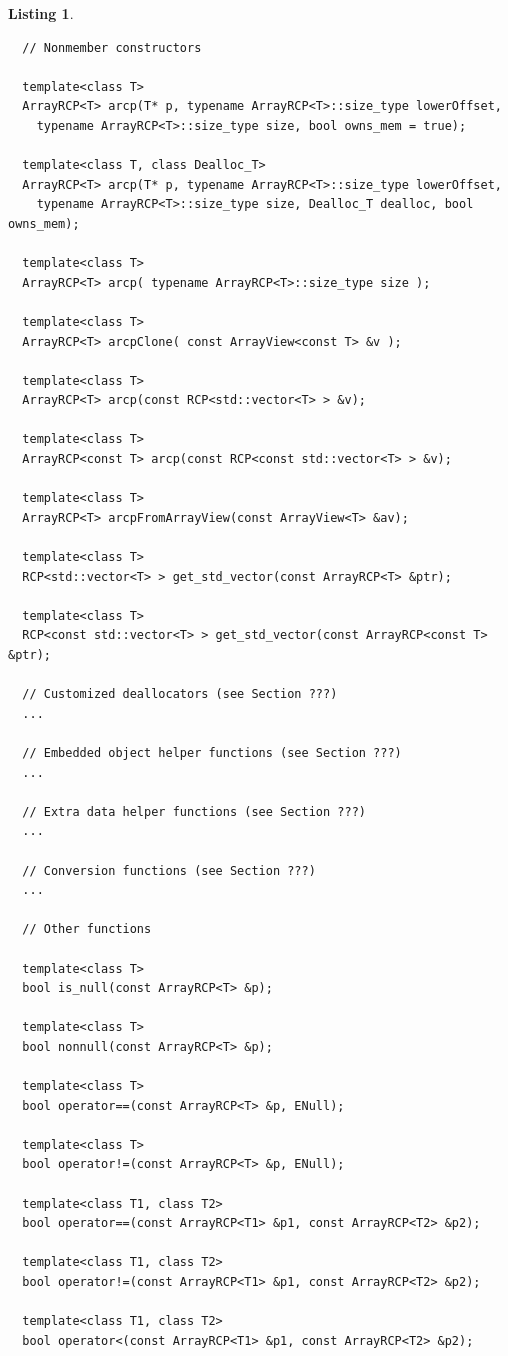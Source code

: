 \documentclass[pdf,ps2pdf,11pt]{SANDreport}
\newtheorem{listing}{Listing}
\begin{document}
\begin{listing}
{\begin{verbatim}
  // Nonmember constructors
  
  template<class T>
  ArrayRCP<T> arcp(T* p, typename ArrayRCP<T>::size_type lowerOffset,
    typename ArrayRCP<T>::size_type size, bool owns_mem = true);
  
  template<class T, class Dealloc_T>
  ArrayRCP<T> arcp(T* p, typename ArrayRCP<T>::size_type lowerOffset,
    typename ArrayRCP<T>::size_type size, Dealloc_T dealloc, bool owns_mem);
  
  template<class T>
  ArrayRCP<T> arcp( typename ArrayRCP<T>::size_type size );
  
  template<class T>
  ArrayRCP<T> arcpClone( const ArrayView<const T> &v );
  
  template<class T>
  ArrayRCP<T> arcp(const RCP<std::vector<T> > &v);
  
  template<class T>
  ArrayRCP<const T> arcp(const RCP<const std::vector<T> > &v);
  
  template<class T>
  ArrayRCP<T> arcpFromArrayView(const ArrayView<T> &av);
  
  template<class T>
  RCP<std::vector<T> > get_std_vector(const ArrayRCP<T> &ptr);
  
  template<class T>
  RCP<const std::vector<T> > get_std_vector(const ArrayRCP<const T> &ptr);

  // Customized deallocators (see Section ???)
  ...

  // Embedded object helper functions (see Section ???)
  ...

  // Extra data helper functions (see Section ???)
  ...

  // Conversion functions (see Section ???)
  ...

  // Other functions
  
  template<class T>
  bool is_null(const ArrayRCP<T> &p);
  
  template<class T>
  bool nonnull(const ArrayRCP<T> &p);
  
  template<class T>
  bool operator==(const ArrayRCP<T> &p, ENull);
  
  template<class T>
  bool operator!=(const ArrayRCP<T> &p, ENull);
  
  template<class T1, class T2>
  bool operator==(const ArrayRCP<T1> &p1, const ArrayRCP<T2> &p2);
  
  template<class T1, class T2>
  bool operator!=(const ArrayRCP<T1> &p1, const ArrayRCP<T2> &p2);
  
  template<class T1, class T2>
  bool operator<(const ArrayRCP<T1> &p1, const ArrayRCP<T2> &p2);
  

\end{verbatim}}
\end{listing}
\end{document}
